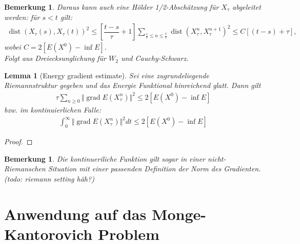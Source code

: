 \documentclass[11pt,a4paper,notitlepage]{scrreprt}
\newcommand{\dist}{\operatorname{dist}}
\newcommand{\grad}{\operatorname{grad}}
\newtheorem{lem}[defi]{Lemma}
\newtheorem{bem}[defi]{Bemerkung}
\begin{document}
\begin{bem}
Daraus kann auch eine Hölder 1/2-Abschätzung für $X_\tau$ abgeleitet werden: für $s<t$ gilt:
\begin{eqnarray}
\dist(X_\tau(s),X_\tau(t))^2 \leq \left[\dfrac{t-s}{\tau}+1\right] \sum_{\frac{s}{\tau}\leq n \leq \frac{t}{\tau}} \dist (X^n_\tau, X_\tau^{n+1})^2 \leq C[(t-s)+\tau], \label{Hölder}
\end{eqnarray}
wobei $C=2[E(X^0)-\inf E]$.
\\ 
Folgt aus Dreiecksunglichung für $W_2$ und Cauchy-Schwarz.
\end{bem}
 
\begin{lem}[Energy gradient estimate]
Sei eine zugrundeliegende Riemannstruktur gegeben und das Energie Funktional hinreichend glatt. Dann gilt 
\begin{eqnarray}
\tau \sum_{n\geq 0} \Vert\grad E(X_\tau^n)\Vert^2 \leq 2[E(X^0)-\inf E]
\end{eqnarray}
bzw. im kontinuierlichen Falle:
\begin{eqnarray}
\int_0^\infty \Vert\grad E(X_\tau^n)\Vert^2 dt\leq 2[E(X^0)-\inf E]
\label{Engrad}
\end{eqnarray}
\end{lem}
\begin{proof}

\end{proof}
\begin{bem}
Die kontinueriliche Funktion gilt sogar in einer nicht-Riemanschen Situation mit einer passenden Definition der Norm des Gradienten. (todo: riemann setting häh?) 
\end{bem}

\section{Anwendung auf das Monge-Kantorovich Problem}
\end{document}
